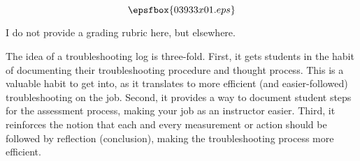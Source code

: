 

$$\epsfbox{03933x01.eps}$$

\vfil \eject






I do not provide a grading rubric here, but elsewhere.







The idea of a troubleshooting log is three-fold.  First, it gets students in the habit of documenting their troubleshooting procedure and thought process.  This is a valuable habit to get into, as it translates to more efficient (and easier-followed) troubleshooting on the job.  Second, it provides a way to document student steps for the assessment process, making your job as an instructor easier.  Third, it reinforces the notion that each and every measurement or action should be followed by reflection (conclusion), making the troubleshooting process more efficient.




